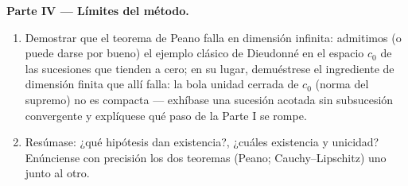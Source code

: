 \begin{problem}[{Problema de fin de semana --- existencia de soluciones
de
$x' = f(t, x)$ sin hipótesis de Lipschitz}]
\medskip
\noindent\textbf{Parte IV --- Límites del método.}
\begin{enumerate}[resume]
  \item Demostrar que el teorema de Peano falla en dimensión infinita:
  admitimos (o puede darse por bueno) el ejemplo clásico de Dieudonné en
  el espacio $c_0$ de las sucesiones que tienden a cero; en su lugar,
  demuéstrese el ingrediente de dimensión finita que allí falla: la bola
  unidad cerrada de $c_0$ (norma del supremo) no es
  compacta --- exhíbase una sucesión
  acotada sin subsucesión convergente y explíquese qué paso de la Parte
  I se rompe. \item Resúmase: ¿qué hipótesis dan existencia?, ¿cuáles
  existencia y unicidad? Enúnciense con precisión los dos teoremas
  (Peano; Cauchy--Lipschitz) uno junto al otro.
\end{enumerate}


\end{problem}
